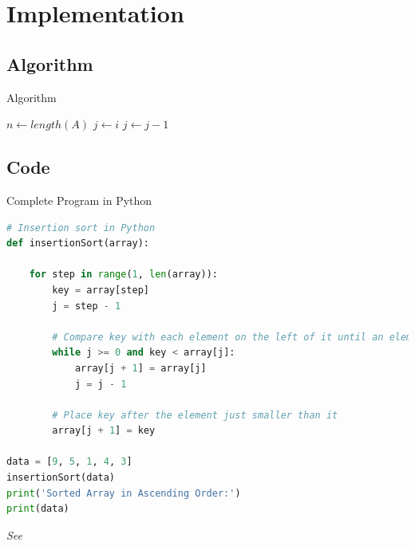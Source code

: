 \documentclass[12pt, aspectratio=54, xcolor=table]{beamer}
\begin{document}
\section {Implementation}
\subsection{Algorithm}
\begin{frame}[fragile]{Algorithm}
    
\begin{algorithm}[H]
\caption{Insertion algorithm}\label{insertion}
\begin{algorithmic}[1]
\State $n\gets length(A)$
\State $j\gets i$
\State $j\gets j-1$
\EndWhile\label{endwhile} 
\EndFor{}
\EndProcedure
\end{algorithmic}
\end{algorithm}

\end{frame}

    


\subsection{Code}

\begin{frame}[fragile]{Complete Program in Python}
    \tiny{
    \begin{lstlisting}[language=Python]
# Insertion sort in Python
def insertionSort(array):

    for step in range(1, len(array)):
        key = array[step]
        j = step - 1
        
        # Compare key with each element on the left of it until an element smaller than it is found      
        while j >= 0 and key < array[j]:
            array[j + 1] = array[j]
            j = j - 1
        
        # Place key after the element just smaller than it
        array[j + 1] = key

data = [9, 5, 1, 4, 3]
insertionSort(data)
print('Sorted Array in Ascending Order:')
print(data)   \end{lstlisting}
   }
\textit{See \cite{Code}}
\end{frame}
\end{document}
